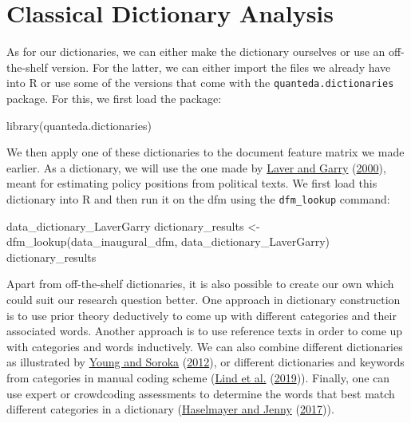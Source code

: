 \documentclass[
]{book}
\newenvironment{Shaded}{\begin{snugshade}}{\end{snugshade}}
\newcommand{\FunctionTok}[1]{\textcolor[rgb]{0.00,0.00,0.00}{#1}}
\newcommand{\NormalTok}[1]{#1}
\newcommand{\OtherTok}[1]{\textcolor[rgb]{0.56,0.35,0.01}{#1}}
\begin{document}
\hypertarget{classical-dictionary-analysis}{%
\section{Classical Dictionary Analysis}\label{classical-dictionary-analysis}}

As for our dictionaries, we can either make the dictionary ourselves or use an off-the-shelf version. For the latter, we can either import the files we already have into R or use some of the versions that come with the \texttt{quanteda.dictionaries} package. For this, we first load the package:

\begin{Shaded}
\begin{Highlighting}[]
\FunctionTok{library}\NormalTok{(quanteda.dictionaries)}
\end{Highlighting}
\end{Shaded}

We then apply one of these dictionaries to the document feature matrix we made earlier. As a dictionary, we will use the one made by \protect\hyperlink{ref-Laver2000a}{Laver and Garry} (\protect\hyperlink{ref-Laver2000a}{2000}), meant for estimating policy positions from political texts. We first load this dictionary into R and then run it on the dfm using the \texttt{dfm\_lookup} command:

\begin{Shaded}
\begin{Highlighting}[]
\NormalTok{data\_dictionary\_LaverGarry}
\NormalTok{dictionary\_results }\OtherTok{\textless{}{-}} \FunctionTok{dfm\_lookup}\NormalTok{(data\_inaugural\_dfm, data\_dictionary\_LaverGarry)}
\NormalTok{dictionary\_results}
\end{Highlighting}
\end{Shaded}

Apart from off-the-shelf dictionaries, it is also possible to create our own which could suit our research question better. One approach in dictionary construction is to use prior theory deductively to come up with different categories and their associated words. Another approach is to use reference texts in order to come up with categories and words inductively. We can also combine different dictionaries as illustrated by \protect\hyperlink{ref-Young2012}{Young and Soroka} (\protect\hyperlink{ref-Young2012}{2012}), or different dictionaries and keywords from categories in manual coding scheme (\protect\hyperlink{ref-Lind2019}{Lind et al.} (\protect\hyperlink{ref-Lind2019}{2019})). Finally, one can use expert or crowdcoding assessments to determine the words that best match different categories in a dictionary (\protect\hyperlink{ref-Haselmayer2017}{Haselmayer and Jenny} (\protect\hyperlink{ref-Haselmayer2017}{2017})).
\end{document}
